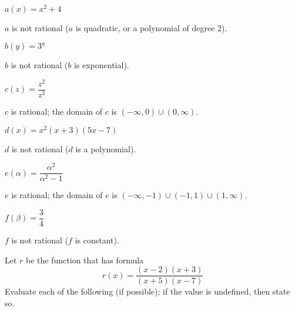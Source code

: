 \begin{exercises}
\begin{problem}
\begin{multicols}{3}
\begin{subproblem}
 			$a(x)=x^2+4$
 			\begin{shortsolution}
 				$a$ is not rational ($a$ is quadratic, or a polynomial of degree $2$).
 			\end{shortsolution}
 		\end{subproblem}
 		\begin{subproblem}
 			$b(y)=3^y$
 			\begin{shortsolution}
 				$b$ is not rational ($b$ is exponential).
 			\end{shortsolution}
 		\end{subproblem}
 		\begin{subproblem}
 			$c(z)=\dfrac{z^2}{z^3}$
 			\begin{shortsolution}
 				$c$ is rational; the domain of $c$ is $(-\infty,0)\cup (0,\infty)$.
 			\end{shortsolution}
 		\end{subproblem}
 		\begin{subproblem}
 			$d(x)=x^2(x+3)(5x-7)$
 			\begin{shortsolution}
 				$d$ is not rational ($d$ is a polynomial).
 			\end{shortsolution}
 		\end{subproblem}
 		\begin{subproblem}
 			$e(\alpha)=\dfrac{\alpha^2}{\alpha^2-1}$
 			\begin{shortsolution}
 				$e$ is rational; the domain of $e$ is $(-\infty,-1)\cup(-1,1)\cup(1,\infty)$.
 			\end{shortsolution}
 		\end{subproblem}
 		\begin{subproblem}
 			$f(\beta)=\dfrac{3}{4}$
 			\begin{shortsolution}
 				$f$ is not rational ($f$ is constant).
 			\end{shortsolution}
 		\end{subproblem}
 	\end{multicols}
 	\end{problem}
 	\begin{problem}
 	Let $r$ be the function that has formula
 	\[
 		r(x)=\frac{(x-2)(x+3)}{(x+5)(x-7)}
 	\]
 	Evaluate each of the following (if possible); if the value is undefined,
 	then state so.
 	\begin{multicols}{4}
 		\begin{subproblem}

\end{subproblem}
\end{multicols}
\end{problem}
\end{exercises}
